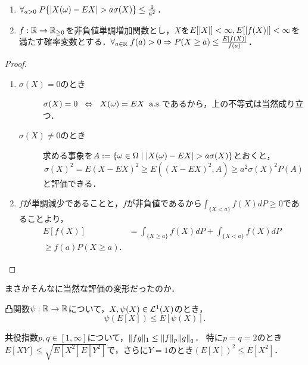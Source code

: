 \documentclass[uplatex,dvipdfmx]{jsreport}
\begin{document}
\begin{theorem}[Chebyshevの不等式]\label{thm-Chebyshev-inequality}\mbox{}
    \begin{enumerate}
        \item $\forall_{a>0}\;P\{\lvert X(\omega)-EX\rvert>a\sigma(X)\}\le\frac{1}{a^2}$．
        \item $f:\mathbb{R}\to\mathbb{R}_{\ge 0}$を非負値単調増加関数とし，$X$を$E[\lvert X\rvert]<\infty,E[\lvert f(X)\rvert]<\infty$を満たす確率変数とする．$\forall_{a\in\mathbb{R}}\;f(a)>0\Rightarrow P(X\ge a)\le\frac{E[f(X)]}{f(a)}$．
    \end{enumerate}
\end{theorem}
\begin{proof}\mbox{}
    \begin{enumerate}
        \item 
    \begin{description}
        \item[$\sigma(X)=0$のとき] $\sigma(X)=0\;\;\Leftrightarrow\;\; X(\omega)=EX\;\;\mathrm{a.s.}$であるから，上の不等式は当然成り立つ．
        \item[$\sigma(X)\ne0$のとき] 求める事象を$A:=\left\{\omega\in\Omega\mid\lvert X(\omega)-EX\rvert>a\sigma(X)\right\}$とおくと，
        \[\sigma(X)^2=E(X-EX)^2\ge E((X-EX)^2,A)\ge a^2\sigma(X)^2P(A)\]
        と評価できる．
    \end{description}
        \item $f$が単調減少であることと，$f$が非負値であるから$\int_{\{X<a\}}f(X)dP\ge 0$であることより，
        \begin{align*}
            E[f(X)]&=\int_{\{X\ge a\}}f(X)dP+\int_{\{X< a\}}f(X)dP\\
            \ge f(a)P(X\ge a).
        \end{align*}
    \end{enumerate}
\end{proof}
\begin{remarks}
    まさかそんなに当然な評価の変形だったのか．
\end{remarks}

\begin{lemma}
    凸関数$\psi:\mathbb{R}\to\mathbb{R}$について，$X,\psi(X)\in\mathcal{L}^1(X)$のとき，
    \[\psi(E[X])\le E[\psi(X)].\]
\end{lemma}

\begin{lemma}
    共役指数$p,q\in[1,\infty]$について，$\|fg\|_1\le\|f\|_p\|g\|_q$．
    特に$p=q=2$のとき$E[XY]\le\sqrt{E[X^2]E[Y^2]}$で，さらに$Y=1$のとき$(E[X])^2\le E[X^2]$．
\end{lemma}
\end{document}
